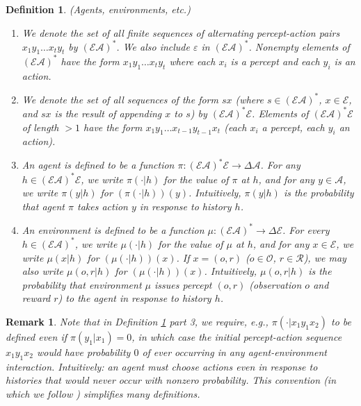 \documentclass[twoside]{article}
\newtheorem{definition}[theorem]{Definition}
\newtheorem{remark}[theorem]{Remark}
\begin{document}
\begin{definition}
\label{omnibusdefn}
    (Agents, environments, etc.)
    \begin{enumerate}
        \item
        We denote the set of all finite sequences
        of alternating percept-action pairs $x_1y_1\ldots x_ty_t$
        by $(\mathcal E\mathcal A)^*$.
        We also include $\varepsilon$ in $(\mathcal E\mathcal A)^*$.
        Nonempty elements of $(\mathcal E\mathcal A)^*$ have the
        form $x_1y_1\ldots x_ty_t$ where each $x_i$ is a percept and
        each $y_i$ is an action.
        \item
        We denote the set of all sequences of the form $sx$ (where
        $s\in (\mathcal E\mathcal A)^*$, $x\in\mathcal E$, and $sx$
        is the result of appending $x$ to $s$) by
        $(\mathcal E\mathcal A)^*\mathcal E$.
        Elements of $(\mathcal E\mathcal A)^* \mathcal E$
        of length $>1$ have the form
        $x_1y_1\ldots x_{t-1}y_{t-1}x_t$
        (each $x_i$ a percept, each $y_i$ an action).
        \item
        An \emph{agent} is defined to be a function
        $\pi:(\mathcal E\mathcal A)^*\mathcal E\to \Delta \mathcal A$.
        For any $h\in (\mathcal E\mathcal A)^*\mathcal E$,
        we write $\pi(\cdot|h)$ for the value of $\pi$ at $h$, and
        for any $y\in \mathcal A$, we write $\pi(y|h)$ for
        $(\pi(\cdot|h))(y)$.
        Intuitively, $\pi(y|h)$ is the probability that agent $\pi$
        takes action $y$ in response to history $h$.
        \item
        An \emph{environment} is defined to be a function
        $\mu:(\mathcal E\mathcal A)^*\to\Delta\mathcal E$.
        For every $h\in(\mathcal E\mathcal A)^*$, we write
        $\mu(\cdot|h)$ for the value of $\mu$ at $h$, and for any
        $x\in\mathcal E$, we write $\mu(x|h)$ for $(\mu(\cdot|h))(x)$.
        If $x=(o,r)$ ($o\in\mathcal O$, $r\in\mathcal R$), we may also
        write $\mu(o,r|h)$ for $(\mu(\cdot|h))(x)$.
        Intuitively, $\mu(o,r|h)$ is the probability that environment
        $\mu$ issues percept $(o,r)$ (observation $o$ and reward $r$)
        to the agent in response to history $h$.
    \end{enumerate}
\end{definition}

\begin{remark}
\label{impossibleremark}
    Note that in Definition \ref{omnibusdefn} part 3, we require,
    e.g., $\pi(\cdot|x_1y_1x_2)$ to be defined even if
    $\pi(y_1|x_1)=0$, in which case the initial percept-action sequence $x_1y_1x_2$
    would have probability $0$ of ever occurring in any agent-environment
    interaction. Intuitively: an agent must choose actions even
    in response to histories that would never occur with nonzero probability.
    This convention (in which we follow \cite{legg2007universal}) simplifies
    many definitions.
\end{remark}
\end{document}
